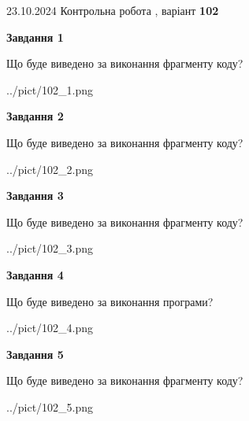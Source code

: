 \documentclass[12pt, ukrainian]{article}
\begin{document}
{\Large{23.10.2024 Контрольна робота , варіант  \No \textbf { 102 }\par}}
{
\begin {large}
{\begin {center}\textbf{Завдання 1}\end {center}}

Що буде виведено за виконання фрагменту коду?\par
\begin{center}
	{../pict/102_1.png}
\end{center}
\newpage

{\begin {center}\textbf{Завдання 2}\end {center}}

Що буде виведено за виконання фрагменту коду?\par
\begin{center}
	{../pict/102_2.png}
\end{center}
\newpage

{\begin {center}\textbf{Завдання 3}\end {center}}

Що буде виведено за виконання фрагменту коду?\par
\begin{center}
	{../pict/102_3.png}
\end{center}
\newpage

{\begin {center}\textbf{Завдання 4}\end {center}}

Що буде виведено за виконання програми?\par
\begin{center}
	{../pict/102_4.png}
\end{center}
\newpage

{\begin {center}\textbf{Завдання 5}\end {center}}

Що буде виведено за виконання фрагменту коду?\par
\begin{center}
	{../pict/102_5.png}
\end{center}
\newpage


\end{large}}
\end{document}
